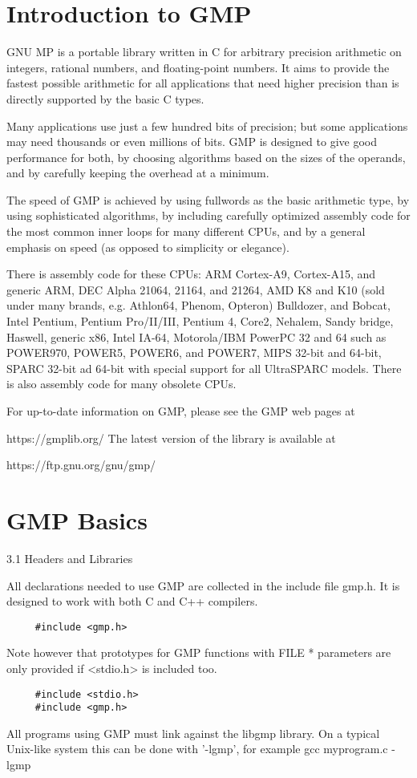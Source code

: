 \section{Introduction to GMP}
GNU MP is a portable library written in C for arbitrary precision arithmetic on
integers, rational numbers, and floating-point numbers. It aims to provide the
fastest possible arithmetic for all applications that need higher precision than
is directly supported by the basic C types.

Many applications use just a few hundred bits of precision; but some
applications may need thousands or even millions of bits. GMP is designed to
give good performance for both, by choosing algorithms based on the sizes of the
operands, and by carefully keeping the overhead at a minimum.

The speed of GMP is achieved by using fullwords as the basic arithmetic type, by
using sophisticated algorithms, by including carefully optimized assembly code
for the most common inner loops for many different CPUs, and by a general
emphasis on speed (as opposed to simplicity or elegance).

There is assembly code for these CPUs: ARM Cortex-A9, Cortex-A15, and generic
ARM, DEC Alpha 21064, 21164, and 21264, AMD K8 and K10 (sold under many brands,
e.g. Athlon64, Phenom, Opteron) Bulldozer, and Bobcat, Intel Pentium, Pentium
Pro/II/III, Pentium 4, Core2, Nehalem, Sandy bridge, Haswell, generic x86, Intel
IA-64, Motorola/IBM PowerPC 32 and 64 such as POWER970, POWER5, POWER6, and
POWER7, MIPS 32-bit and 64-bit, SPARC 32-bit ad 64-bit with special support for
all UltraSPARC models. There is also assembly code for many obsolete CPUs.

For up-to-date information on GMP, please see the GMP web pages at

     https://gmplib.org/
The latest version of the library is available at

     https://ftp.gnu.org/gnu/gmp/

\section{GMP Basics}
3.1 Headers and Libraries

All declarations needed to use GMP are collected in the include file gmp.h. It
is designed to work with both C and C++ compilers.
\begin{lstlisting}
     #include <gmp.h>
\end{lstlisting}     
Note however that prototypes for GMP functions with FILE * parameters are only
provided if <stdio.h> is included too.
\begin{lstlisting}
     #include <stdio.h>
     #include <gmp.h>
\end{lstlisting}     
All programs using GMP must link against the libgmp library. On a typical
Unix-like system this can be done with '-lgmp', for example gcc myprogram.c
-lgmp

